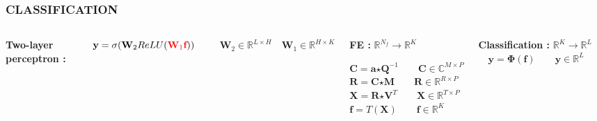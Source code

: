 \documentclass{beamer}
\begin{document}
\begin{frame}
\frametitle{CLASSIFICATION}
\begin{columns}[c]
\textbf{Two-layer perceptron :}
\bigskip

$\quad \textbf{y} = \sigma(\textbf{W}_{2}ReLU({\color{red}\textbf{W}_{1}\textbf{f}}))$
\bigskip

$\quad \textbf{W}_{2} \in \mathbb{R}^{L \times H} \quad \textbf{W}_{1} \in \mathbb{R}^{H \times K}$

\begin{block}{\textbf{FE :} $\mathbb{R}^{N_{f}} \rightarrow \mathbb{R}^{K}$}

$\textbf{C} = \textbf{a} \bm{\star} \textbf{Q}^{-1} \qquad \textbf{C} \in \mathbb{C}^{M \times P}$\\
$\textbf{R} = \textbf{C} \bm{\star} \textbf{M} \qquad \textbf{R} \in \mathbb{R}^{R \times P}$\\
$\textbf{X} = \textbf{R} \bm{\star} \textbf{V}^{T} \qquad \textbf{X} \in \mathbb{R}^{T \times P}$\\
$\textbf{f} = T(\textbf{X}) \qquad \textbf{f} \in \mathbb{R}^{K}$\\
\end{block}
\begin{block}{\textbf{Classification :} $\mathbb{R}^{K} \rightarrow \mathbb{R}^{L}$}
$\quad \textbf{y} = \bm{\Phi}(\textbf{f}) \qquad \textbf{y} \in \mathbb{R}^{L}$
\end{block}
\end{columns}
\end{frame}
\end{document}
